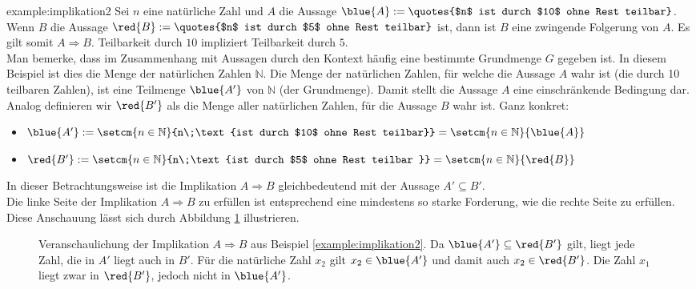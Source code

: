 \clearpage
\begin{example}{example:implikation2}
	Sei $n$ eine natürliche Zahl und $A$ die Aussage $\blue{A} := \text{\quotes{$n$ ist durch $10$ ohne Rest teilbar}}$. Wenn $B$ die Aussage
	$\red{B} := \text{\quotes{$n$ ist durch $5$ ohne Rest teilbar}}$ ist, dann ist $B$ eine zwingende Folgerung von $A$. Es gilt somit $A \Rightarrow B$. Teilbarkeit durch $10$ impliziert Teilbarkeit durch $5$.\\

	\noindent
	Man bemerke, dass im Zusammenhang mit Aussagen durch den Kontext häufig eine bestimmte Grundmenge $G$ gegeben ist. In diesem Beispiel ist dies die Menge der natürlichen Zahlen $\mathbb{N}$. Die Menge der natürlichen Zahlen, für welche die Aussage $A$ wahr ist (die durch 10 teilbaren Zahlen), ist eine Teilmenge $\blue{A'}$ von $\mathbb{N}$ (der Grundmenge). Damit stellt die Aussage $A$ eine einschränkende Bedingung dar. Analog definieren wir $\red{B'}$ als die Menge aller natürlichen Zahlen, für die Aussage $B$ wahr ist. Ganz konkret:
	\begin{itemize}
		\item $\blue{A'} := \setcm{n\in\mathbb{N}}{n\;\text{ist durch $10$ ohne Rest teilbar}} = \setcm{n\in\mathbb{N}}{\blue{A}}$
		\item $\red{B'} := \setcm{n\in\mathbb{N}}{n\;\text{ist durch $5$ ohne Rest teilbar }} = \setcm{n\in\mathbb{N}}{\red{B}}$
	\end{itemize}
	\noindent
	In dieser Betrachtungsweise ist die Implikation $A\Rightarrow B$ gleichbedeutend mit der Aussage $A'\subseteq B'$.\\
	Die linke Seite der Implikation $A\Rightarrow B$ zu erfüllen ist entsprechend eine mindestens so starke Forderung, wie die rechte Seite zu erfüllen. Diese Anschauung lässt sich durch Abbildung \cref{fig:subset_implication} illustrieren.
\end{example}
\begin{figure}[h!]
	\centering
	\caption{Veranschaulichung der Implikation $A\Rightarrow B$ aus Beispiel \cref{example:implikation2}. Da $\blue{A'}\subseteq \red{B'}$ gilt, liegt jede Zahl, die in $A'$ liegt auch in $B'$. Für die natürliche Zahl $x_2$ gilt $x_2\in\blue{A'}$ und damit auch $x_2\in\red{B'}$. Die Zahl $x_1$ liegt zwar in $\red{B'}$, jedoch nicht in $\blue{A'}$.}
	\label{fig:subset_implication}
\end{figure}
\clearpage

